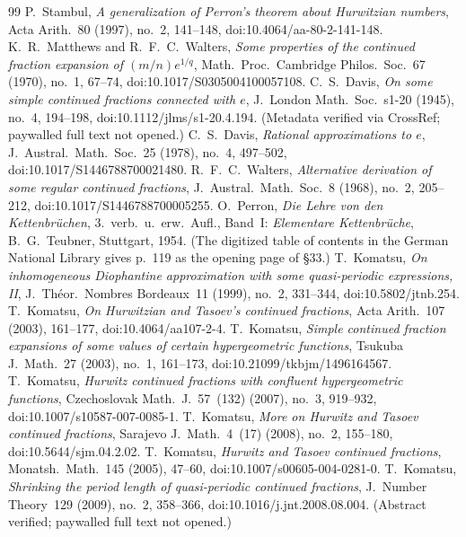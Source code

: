 \documentclass[11pt]{amsart}
\theoremstyle{definition}
\theoremstyle{remark}
\numberwithin{equation}{section}
\begin{document}
\begin{thebibliography}{99}
 P.~Stambul, \emph{A generalization of Perron's theorem about Hurwitzian numbers}, Acta Arith.~80 (1997), no.~2, 141--148, doi:10.4064/aa-80-2-141-148.
 K.~R.~Matthews and R.~F.~C.~Walters, \emph{Some properties of the continued fraction expansion of $(m/n)e^{1/q}$}, Math.~Proc.~Cambridge Philos.~Soc.~67 (1970), no.~1, 67--74, doi:10.1017/S0305004100057108.
 C.~S.~Davis, \emph{On some simple continued fractions connected with $e$}, J.~London Math.~Soc.~s1-20 (1945), no.~4, 194--198, doi:10.1112/jlms/s1-20.4.194. (Metadata verified via CrossRef; paywalled full text not opened.)
 C.~S.~Davis, \emph{Rational approximations to $e$}, J.~Austral.~Math.~Soc.~25 (1978), no.~4, 497--502, doi:10.1017/S1446788700021480.
 R.~F.~C.~Walters, \emph{Alternative derivation of some regular continued fractions}, J.~Austral.~Math.~Soc.~8 (1968), no.~2, 205--212, doi:10.1017/S1446788700005255.
 O.~Perron, \emph{Die Lehre von den Kettenbr\"uchen}, 3.~verb.~u.~erw.~Aufl., Band~I: \emph{Elementare Kettenbr\"uche}, B.~G.~Teubner, Stuttgart, 1954. (The digitized table of contents in the German National Library gives p.~119 as the opening page of \S33.)
 T.~Komatsu, \emph{On inhomogeneous Diophantine approximation with some quasi-periodic expressions, II}, J.~Th\'eor.~Nombres Bordeaux~11 (1999), no.~2, 331--344, doi:10.5802/jtnb.254.
 T.~Komatsu, \emph{On Hurwitzian and Tasoev's continued fractions}, Acta Arith.~107 (2003), 161--177, doi:10.4064/aa107-2-4.
 T.~Komatsu, \emph{Simple continued fraction expansions of some values of certain hypergeometric functions}, Tsukuba J.~Math.~27 (2003), no.~1, 161--173, doi:10.21099/tkbjm/1496164567.
 T.~Komatsu, \emph{Hurwitz continued fractions with confluent hypergeometric functions}, Czechoslovak Math.~J.~57~(132) (2007), no.~3, 919--932, doi:10.1007/s10587-007-0085-1.
 T.~Komatsu, \emph{More on Hurwitz and Tasoev continued fractions}, Sarajevo J.~Math.~4~(17) (2008), no.~2, 155--180, doi:10.5644/sjm.04.2.02.
 T.~Komatsu, \emph{Hurwitz and Tasoev continued fractions}, Monatsh.\ Math.~145 (2005), 47--60, doi:10.1007/s00605-004-0281-0.
 T.~Komatsu, \emph{Shrinking the period length of quasi-periodic continued fractions}, J.~Number Theory~129 (2009), no.~2, 358--366, doi:10.1016/j.jnt.2008.08.004. (Abstract verified; paywalled full text not opened.)

\end{thebibliography}
\end{document}
